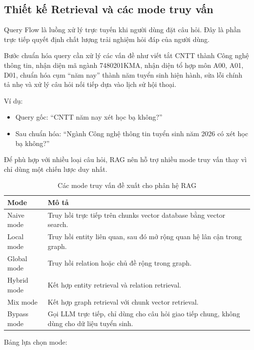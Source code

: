\subsection{Thiết kế Retrieval và các mode truy vấn}

Query Flow là luồng xử lý trực tuyến khi người dùng đặt câu hỏi. Đây là phần trực tiếp quyết định chất lượng trải nghiệm hỏi đáp của người dùng.

Bước chuẩn hóa query cần xử lý các vấn đề như viết tắt CNTT thành Công nghệ thông tin, nhận diện mã ngành 7480201KMA, nhận diện tổ hợp môn A00, A01, D01, chuẩn hóa cụm ``năm nay'' thành năm tuyển sinh hiện hành, sửa lỗi chính tả nhẹ và xử lý câu hỏi nối tiếp dựa vào lịch sử hội thoại.

Ví dụ:

\begin{itemize}
    \item Query gốc: ``CNTT năm nay xét học bạ không?''
    \item Sau chuẩn hóa: ``Ngành Công nghệ thông tin tuyển sinh năm 2026 có xét học bạ không?''
\end{itemize}

Để phù hợp với nhiều loại câu hỏi, RAG nên hỗ trợ nhiều mode truy vấn thay vì chỉ dùng một chiến lược duy nhất.

\begin{table}[H]
\centering
\begin{tabular}{|p{3.2cm}|p{9.6cm}|}
\hline
\textbf{Mode} & \textbf{Mô tả} \\
\hline
Naive mode & Truy hồi trực tiếp trên chunks vector database bằng vector search. \\
\hline
Local mode & Truy hồi entity liên quan, sau đó mở rộng quan hệ lân cận trong graph. \\
\hline
Global mode & Truy hồi relation hoặc chủ đề rộng trong graph. \\
\hline
Hybrid mode & Kết hợp entity retrieval và relation retrieval. \\
\hline
Mix mode & Kết hợp graph retrieval với chunk vector retrieval. \\
\hline
Bypass mode & Gọi LLM trực tiếp, chỉ dùng cho câu hỏi giao tiếp chung, không dùng cho dữ liệu tuyển sinh. \\
\hline
\end{tabular}
\caption{Các mode truy vấn đề xuất cho phân hệ RAG}
\label{tab:rag-query-modes}
\end{table}

Bảng lựa chọn mode:

